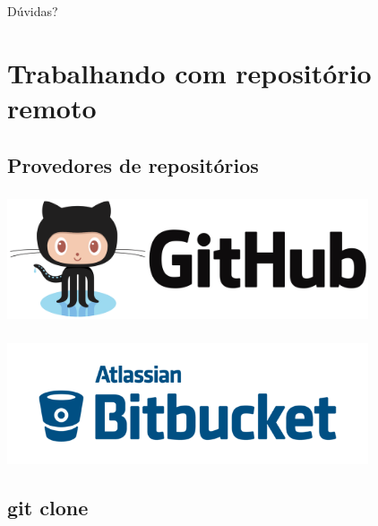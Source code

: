 \documentclass[aspectratio=169]{beamer}
\makeatletter
\newcommand*{\currentname}{\@currentlabelname}
\makeatother
\begin{document}
\begin{frame}
  \begin{center}
    {\Huge Dúvidas?}
  \end{center}
\end{frame}

\section{Trabalhando com repositório remoto}
\subsection{Provedores de repositórios}
\begin{frame}
  \frametitle{\currentname}
  \begin{center}
    \includegraphics[width=0.8\textwidth]{img/github-logo.png}
  \end{center}
\end{frame}

\begin{frame}
  \frametitle{\currentname}
  \begin{center}
    \includegraphics[width=0.8\textwidth]{img/bitbucket-logo.png}
  \end{center}
\end{frame}

\subsection{git clone}
\begin{frame}
  \frametitle{\currentname}
  \begin{itemize}
  \end{itemize}
\end{frame}
\end{document}

